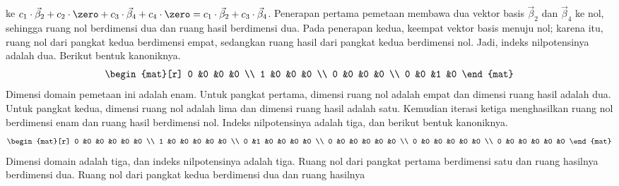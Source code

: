 \begin{exercises}
\begin{answer}
\begin{exparts}
          ke
          $c_1\cdot \vec{\beta}_2+c_2\cdot \zero
            +c_3\cdot \vec{\beta}_4+c_4\cdot \zero
           =c_1\cdot \vec{\beta}_2+c_3\cdot\vec{\beta}_4$.
          Penerapan pertama pemetaan
          membawa dua vektor basis $\vec{\beta}_2$ dan
          $\vec{\beta}_4$ ke nol,
          sehingga ruang nol berdimensi dua dan ruang hasil
          berdimensi dua.
          Pada penerapan kedua, keempat vektor basis menuju
          nol; karena itu, ruang nol dari pangkat kedua berdimensi empat,
          sedangkan ruang hasil dari pangkat kedua berdimensi nol.
          Jadi, indeks nilpotensinya adalah dua.
          Berikut bentuk kanoniknya.
          \begin{equation*}
            \begin{mat}[r]
              0  &0  &0  &0  \\
              1  &0  &0  &0  \\
              0  &0  &0  &0  \\
              0  &0  &1  &0
            \end{mat}
          \end{equation*}
        \partsitem Dimensi domain pemetaan ini adalah enam.
          Untuk pangkat pertama, dimensi ruang nol adalah empat
          dan dimensi ruang hasil adalah dua.
          Untuk pangkat kedua, dimensi ruang nol adalah lima
          dan dimensi ruang hasil adalah satu.
          Kemudian iterasi ketiga menghasilkan ruang nol berdimensi
          enam dan ruang hasil berdimensi nol.
          Indeks nilpotensinya adalah tiga, dan berikut
          bentuk kanoniknya.
          \begin{equation*}
            \begin{mat}[r]
              0  &0  &0  &0  &0  &0  \\
              1  &0  &0  &0  &0  &0  \\
              0  &1  &0  &0  &0  &0  \\
              0  &0  &0  &0  &0  &0  \\              
              0  &0  &0  &0  &0  &0  \\              
              0  &0  &0  &0  &0  &0  
            \end{mat}
          \end{equation*}
        \partsitem Dimensi domain adalah tiga, dan indeks
          nilpotensinya adalah tiga.
          Ruang nol dari pangkat pertama berdimensi satu dan ruang hasilnya
          berdimensi dua.
          Ruang nol dari pangkat kedua berdimensi dua dan ruang hasilnya

\end{exparts}
\end{answer}
\end{exercises}
